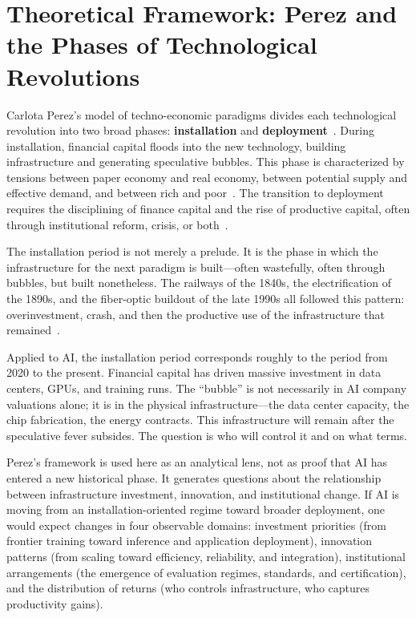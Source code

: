 \section{Theoretical Framework: Perez and the Phases of Technological Revolutions}

Carlota Perez's model of techno-economic paradigms divides each technological revolution into two broad phases: \textbf{installation} and \textbf{deployment}~\cite{perez2002}. During installation, financial capital floods into the new technology, building infrastructure and generating speculative bubbles. This phase is characterized by tensions between paper economy and real economy, between potential supply and effective demand, and between rich and poor~\cite{palma2009}. The transition to deployment requires the disciplining of finance capital and the rise of productive capital, often through institutional reform, crisis, or both~\cite{swilling2019}.

The installation period is not merely a prelude. It is the phase in which the infrastructure for the next paradigm is built---often wastefully, often through bubbles, but built nonetheless. The railways of the 1840s, the electrification of the 1890s, and the fiber-optic buildout of the late 1990s all followed this pattern: overinvestment, crash, and then the productive use of the infrastructure that remained~\cite{perez2002}.

Applied to AI, the installation period corresponds roughly to the period from 2020 to the present. Financial capital has driven massive investment in data centers, GPUs, and training runs. The ``bubble'' is not necessarily in AI company valuations alone; it is in the physical infrastructure---the data center capacity, the chip fabrication, the energy contracts. This infrastructure will remain after the speculative fever subsides. The question is who will control it and on what terms.

Perez's framework is used here as an analytical lens, not as proof that AI has entered a new historical phase. It generates questions about the relationship between infrastructure investment, innovation, and institutional change. If AI is moving from an installation-oriented regime toward broader deployment, one would expect changes in four observable domains: investment priorities (from frontier training toward inference and application deployment), innovation patterns (from scaling toward efficiency, reliability, and integration), institutional arrangements (the emergence of evaluation regimes, standards, and certification), and the distribution of returns (who controls infrastructure, who captures productivity gains).

